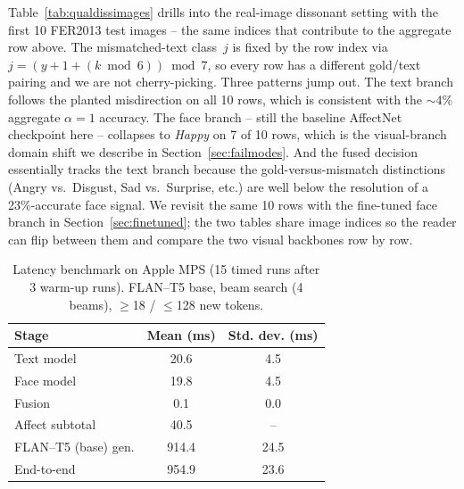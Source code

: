 \documentclass[sigconf,nonacm]{acmart}
\begin{document}
  Table~\ref{tab:qualdissimages} drills into the real-image dissonant setting with the first 10 FER2013 test images -- the same indices that contribute to the aggregate row above. The mismatched-text class~$j$ is fixed by the row index via $j = (y + 1 + (k\bmod 6)) \bmod 7$, so every row has a different gold/text pairing and we are not cherry-picking. Three patterns jump out. The text branch follows the planted misdirection on all 10 rows, which is consistent with the $\sim$4\% aggregate $\alpha\!=\!1$ accuracy. The face branch -- still the baseline AffectNet checkpoint here -- collapses to \emph{Happy} on 7 of 10 rows, which is the visual-branch domain shift we describe in Section~\ref{sec:failmodes}. And the fused decision essentially tracks the text branch because the gold-versus-mismatch distinctions (Angry vs.\ Disgust, Sad vs.\ Surprise, etc.) are well below the resolution of a 23\%-accurate face signal. We revisit the same 10 rows with the fine-tuned face branch in Section~\ref{sec:finetuned}; the two tables share image indices so the reader can flip between them and compare the two visual backbones row by row.

  
  

  \begin{table}[t]
    \centering
    \caption{Latency benchmark on Apple MPS (15 timed runs after 3 warm-up runs). FLAN--T5 base, beam search (4 beams), $\geq$18 / $\leq$128 new tokens.}
    \label{tab:latency}
    \small
    \begin{tabular}{@{}lcc@{}}
      \toprule
      \textbf{Stage} & \textbf{Mean (ms)} & \textbf{Std. dev. (ms)} \\
      \midrule
      Text model            &  20.6 &  4.5 \\
      Face model            &  19.8 &  4.5 \\
      Fusion                &   0.1 &  0.0 \\
      Affect subtotal       &  40.5 &  --  \\
      FLAN--T5 (base) gen.  & 914.4 & 24.5 \\
      End-to-end            & 954.9 & 23.6 \\
      \bottomrule
    \end{tabular}
  \end{table}
\end{document}
